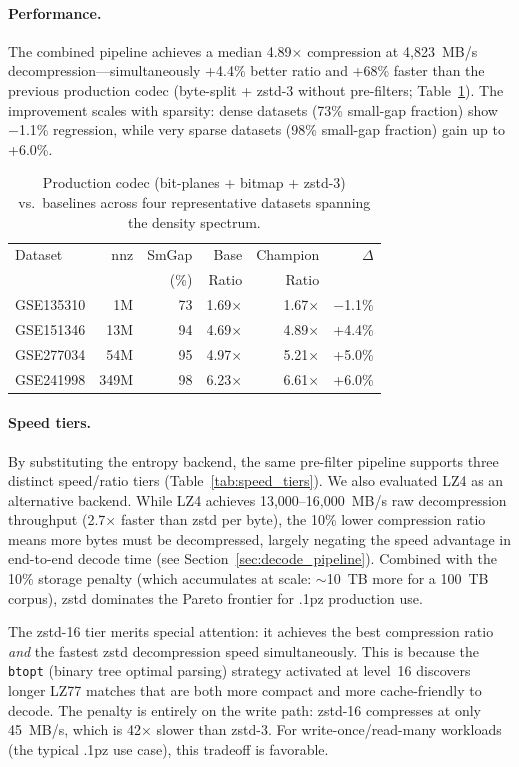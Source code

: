 \documentclass[10pt,twocolumn,letterpaper]{article}
\begin{document}
\paragraph{Performance.}
The combined pipeline achieves a median 4.89$\times$ compression at 4{,}823~MB/s decompression---simultaneously +4.4\% better ratio and +68\% faster than the previous production codec (byte-split + zstd-3 without pre-filters; Table~\ref{tab:champion}).
The improvement scales with sparsity: dense datasets (73\% small-gap fraction) show $-$1.1\% regression, while very sparse datasets (98\% small-gap fraction) gain up to +6.0\%.

\begin{table}[h]
\centering
\caption{Production codec (bit-planes + bitmap + zstd-3) vs.\ baselines across four representative datasets spanning the density spectrum.}
\label{tab:champion}
\footnotesize
\begin{tabular}{l r r r r r}
\toprule
Dataset & nnz & SmGap & Base & Champion & $\Delta$ \\
 & & (\%) & Ratio & Ratio & \\
\midrule
GSE135310 &   1M & 73 & 1.69$\times$ & 1.67$\times$ & $-$1.1\% \\
GSE151346 &  13M & 94 & 4.69$\times$ & 4.89$\times$ & +4.4\% \\
GSE277034 &  54M & 95 & 4.97$\times$ & 5.21$\times$ & +5.0\% \\
GSE241998 & 349M & 98 & 6.23$\times$ & 6.61$\times$ & +6.0\% \\
\bottomrule
\end{tabular}
\end{table}

\paragraph{Speed tiers.}
By substituting the entropy backend, the same pre-filter pipeline supports three distinct speed/ratio tiers (Table~\ref{tab:speed_tiers}).
We also evaluated LZ4 as an alternative backend.
While LZ4 achieves 13{,}000--16{,}000~MB/s raw decompression throughput (2.7$\times$ faster than zstd per byte), the 10\% lower compression ratio means more bytes must be decompressed, largely negating the speed advantage in end-to-end decode time (see Section~\ref{sec:decode_pipeline}).
Combined with the 10\% storage penalty (which accumulates at scale: $\sim$10~TB more for a 100~TB corpus), zstd dominates the Pareto frontier for .1pz production use.

The zstd-16 tier merits special attention: it achieves the best compression ratio \emph{and} the fastest zstd decompression speed simultaneously.
This is because the \texttt{btopt} (binary tree optimal parsing) strategy activated at level~16 discovers longer LZ77 matches that are both more compact and more cache-friendly to decode.
The penalty is entirely on the write path: zstd-16 compresses at only 45~MB/s, which is 42$\times$ slower than zstd-3.
For write-once/read-many workloads (the typical .1pz use case), this tradeoff is favorable.
\end{document}
